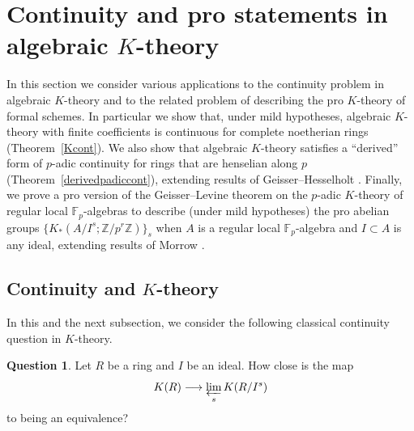 \documentclass{amsart}
\theoremstyle{definition}
\newtheorem*{question}{Question}
\newcommand{\To}{\longrightarrow}
\begin{document}
\section{Continuity and pro statements in algebraic $K$-theory}
In this section we consider various applications to the continuity problem in algebraic $K$-theory and to the related problem of describing the pro $K$-theory of formal schemes.
In particular we show that, under mild hypotheses, algebraic $K$-theory with finite coefficients is continuous for complete noetherian rings (Theorem~\ref{Kcont}). 
We also show that algebraic $K$-theory satisfies a ``derived'' form of $p$-adic
continuity for rings that are henselian along $p$ (Theorem~\ref{derivedpadiccont}), extending
results of Geisser--Hesselholt \cite{GHlocal}. Finally, we prove a pro version of
the Geisser--Levine \cite{GL} theorem on the $p$-adic $K$-theory of regular local
$\mathbb{F}_p$-algebras to describe (under mild hypotheses) the pro abelian groups 
$\{K_*(A/I^s; \mathbb{Z}/p^r\mathbb{Z})\}_s$ when $A$ is a regular local $\mathbb{F}_p$-algebra and $I \subset A$ is any ideal, extending results of Morrow \cite{Morrow-HW}.

\subsection{Continuity and $K$-theory}

In this and the next subsection, we consider the following classical continuity
question in $K$-theory.

\begin{question} 
Let $R$ be a ring and $I$ be an ideal. 
How close is the map \begin{equation} \label{contmap}K(R) \To \varprojlim_s
K(R/I^s) \end{equation} to being an equivalence?
\end{question} 
\end{document}
